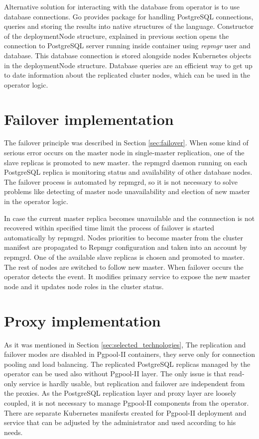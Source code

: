 \documentclass[
  digital, %
  twoside, %
  table,   %
  lof,     %
  lot,     %
]{fithesis3}
\begin{document}
Alternative solution for interacting with the database from operator is to use database connections. Go provides package for handling PostgreSQL connections, queries and storing the results into native structures of the language. Constructor of the deploymentNode structure, explained in previous section opens the connection to PostgreSQL server running inside container using \textit{repmgr} user and database. This database connection is stored alongside nodes Kubernetes objects in the deploymentNode structure. Database queries are an efficient way to get up to date information about the replicated cluster nodes, which can be used in the operator logic.

\section{Failover implementation}
The failover principle was described in Section \ref{sec:failover}. When some  kind of serious error occurs on the master node in single-master replication, one of the slave replicas is promoted to new master. the repmgrd daemon running on each PostgreSQL replica is monitoring status and availability of other database nodes. The failover process is automated by repmgrd, so it is not necessary to solve problems like detecting of master node unavailability and election of new master in the operator logic.

In case the current master replica becomes unavailable and the connnection is not recovered within specified time limit the process of failover is started automatically by repmgrd. Nodes priorities to become master from the cluster manifest are propagated to Repmgr configuration and taken into an account by repmgrd. One of the available slave replicas is chosen and promoted to master. The rest of nodes are switched to follow new master. When failover occurs the operator detects the event. It modifies primary service to expose the new master node and it updates node roles in the cluster status.

\section{Proxy implementation}
As it was mentioned in Section \ref{sec:selected_technologies}, The replication and failover modes are disabled in Pgpool-II containers, they serve only for connection pooling and load balancing. The replicated PostgreSQL replicas managed by the operator can be used also without Pgpool-II layer. The only issue is that read-only service is hardly usable, but replication and failover are independent from the proxies. As the PostgreSQL replication layer and proxy layer are loosely coupled, it is not necessary to manage Pgpool-II components from the operator. There are separate Kubernetes manifests created for Pgpool-II deployment and service that can be adjusted by the administrator and used according to his needs.
\end{document}
